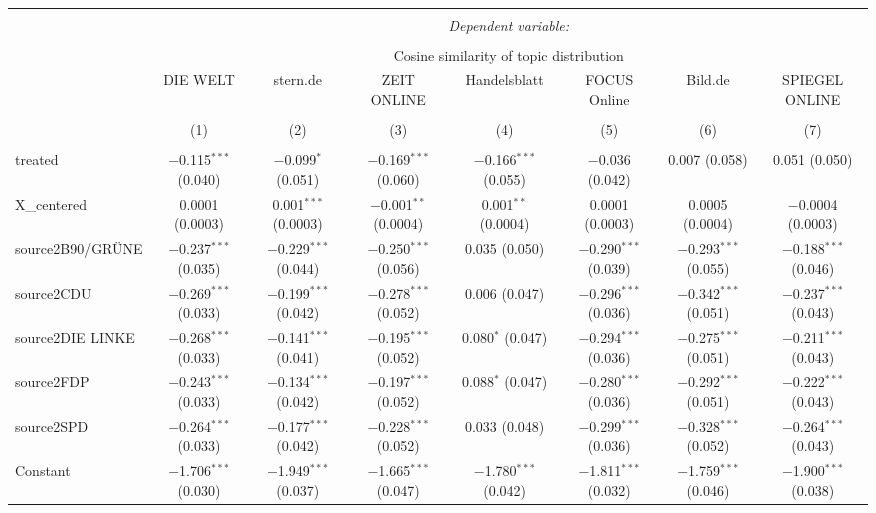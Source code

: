 \documentclass[
]{article}
\begin{document}
\begin{table}[!htbp] \centering 
  \caption{} 
  \label{} 
\tiny 
\begin{tabular}{@{\extracolsep{5pt}}lccccccc} 
\\[-1.8ex]\hline 
\hline \\[-1.8ex] 
 & \multicolumn{7}{c}{\textit{Dependent variable:}} \\ 
\cline{2-8} 
\\[-1.8ex] & \multicolumn{7}{c}{Cosine similarity of topic distribution} \\ 
 & DIE WELT & stern.de & ZEIT ONLINE & Handelsblatt & FOCUS Online & Bild.de & SPIEGEL ONLINE \\ 
\\[-1.8ex] & (1) & (2) & (3) & (4) & (5) & (6) & (7)\\ 
\hline \\[-1.8ex] 
 treated & $-$0.115$^{***}$ (0.040) & $-$0.099$^{*}$ (0.051) & $-$0.169$^{***}$ (0.060) & $-$0.166$^{***}$ (0.055) & $-$0.036 (0.042) & 0.007 (0.058) & 0.051 (0.050) \\ 
  X\_centered & 0.0001 (0.0003) & 0.001$^{***}$ (0.0003) & $-$0.001$^{**}$ (0.0004) & 0.001$^{**}$ (0.0004) & 0.0001 (0.0003) & 0.0005 (0.0004) & $-$0.0004 (0.0003) \\ 
  source2B90/GRÜNE & $-$0.237$^{***}$ (0.035) & $-$0.229$^{***}$ (0.044) & $-$0.250$^{***}$ (0.056) & 0.035 (0.050) & $-$0.290$^{***}$ (0.039) & $-$0.293$^{***}$ (0.055) & $-$0.188$^{***}$ (0.046) \\ 
  source2CDU & $-$0.269$^{***}$ (0.033) & $-$0.199$^{***}$ (0.042) & $-$0.278$^{***}$ (0.052) & 0.006 (0.047) & $-$0.296$^{***}$ (0.036) & $-$0.342$^{***}$ (0.051) & $-$0.237$^{***}$ (0.043) \\ 
  source2DIE LINKE & $-$0.268$^{***}$ (0.033) & $-$0.141$^{***}$ (0.041) & $-$0.195$^{***}$ (0.052) & 0.080$^{*}$ (0.047) & $-$0.294$^{***}$ (0.036) & $-$0.275$^{***}$ (0.051) & $-$0.211$^{***}$ (0.043) \\ 
  source2FDP & $-$0.243$^{***}$ (0.033) & $-$0.134$^{***}$ (0.042) & $-$0.197$^{***}$ (0.052) & 0.088$^{*}$ (0.047) & $-$0.280$^{***}$ (0.036) & $-$0.292$^{***}$ (0.051) & $-$0.222$^{***}$ (0.043) \\ 
  source2SPD & $-$0.264$^{***}$ (0.033) & $-$0.177$^{***}$ (0.042) & $-$0.228$^{***}$ (0.052) & 0.033 (0.048) & $-$0.299$^{***}$ (0.036) & $-$0.328$^{***}$ (0.052) & $-$0.264$^{***}$ (0.043) \\ 
  Constant & $-$1.706$^{***}$ (0.030) & $-$1.949$^{***}$ (0.037) & $-$1.665$^{***}$ (0.047) & $-$1.780$^{***}$ (0.042) & $-$1.811$^{***}$ (0.032) & $-$1.759$^{***}$ (0.046) & $-$1.900$^{***}$ (0.038) \\ 

\end{tabular}
\end{table}
\end{document}
